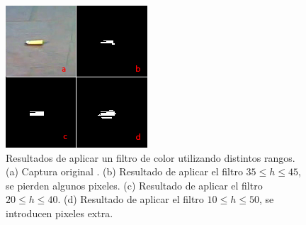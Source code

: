 \begin{figure}[tpb]
\begin{center}
  \includegraphics[scale=0.8]{figuras/hue.png}
\end{center}
  \caption{\small Resultados de aplicar un filtro de color utilizando distintos rangos. (a) Captura original . (b) Resultado de aplicar el filtro $35\le h \le45$, se pierden algunos pixeles. (c) Resultado de aplicar el filtro $20\le h \le40$. (d) Resultado de aplicar el filtro $10 \le h \le 50$, se introducen pixeles extra.} 
  \label{fig:hue_range}
\end{figure}

